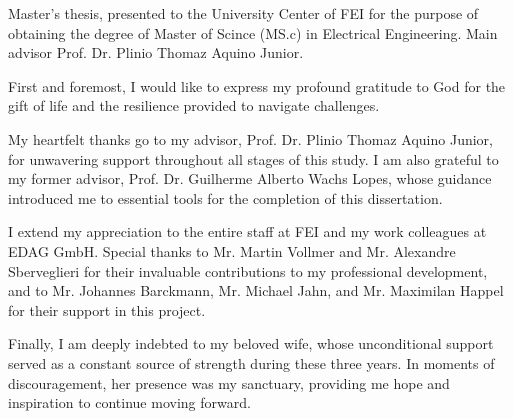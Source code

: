\begin{folhaderosto}
Master's thesis, presented to the University Center of FEI for the purpose of obtaining the degree of Master of Scince (MS.c) in Electrical Engineering. Main advisor Prof. Dr. Plinio Thomaz Aquino Junior.
\end{folhaderosto}



\fichacatalografica
\folhadeaprovacao

%


\begin{agradecimentos}
First and foremost, I would like to express my profound gratitude to God for the gift of life and the resilience provided to navigate challenges.

My heartfelt thanks go to my advisor, Prof. Dr. Plinio Thomaz Aquino Junior, for unwavering support throughout all stages of this study. I am also grateful to my former advisor, Prof. Dr. Guilherme Alberto Wachs Lopes, whose guidance introduced me to essential tools for the completion of this dissertation.

I extend my appreciation to the entire staff at FEI and my work colleagues at EDAG GmbH. Special thanks to Mr. Martin Vollmer and Mr. Alexandre Sberveglieri for their invaluable contributions to my professional development, and to Mr. Johannes Barckmann, Mr. Michael Jahn, and Mr. Maximilan Happel for their support in this project.

Finally, I am deeply indebted to my beloved wife, whose unconditional support served as a constant source of strength during these three years. In moments of discouragement, her presence was my sanctuary, providing me hope and inspiration to continue moving forward.
\end{agradecimentos}

\begin{epigrafe}
\end{epigrafe}